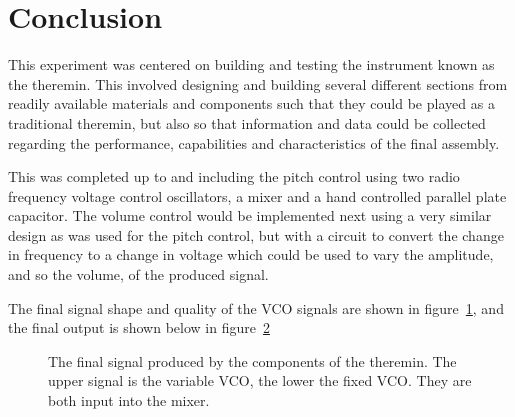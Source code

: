 \section{Conclusion}
This experiment was centered on building and testing the instrument known as the theremin. This involved designing and building several different sections from readily available materials and components such that they could be played as a traditional theremin, but also so that information and data could be collected regarding the performance, capabilities and characteristics of the final assembly.

This was completed up to and including the pitch control using two radio frequency voltage control oscillators, a mixer and a hand controlled parallel plate capacitor. The volume control would be implemented next using a very similar design as was used for the pitch control, but with a circuit to convert the change in frequency to a change in voltage which could be used to vary the amplitude, and so the volume, of the produced signal.

The final signal shape and quality of the VCO signals are shown in figure~\ref{fig:final}, and the final output is shown below in figure~\ref{fig:final out}

\begin{figure}[htb]
	\begin{center}
		
		\caption{The final signal produced by the components of the theremin. The upper signal is the variable VCO, the lower the fixed VCO. They are both input into the mixer.}
		\label{fig:final}
	\end{center}
\end{figure}

\begin{figure}
	\begin{center}
		
		\caption{}
		\label{fig:final out}
	\end{center}
\end{figure}
